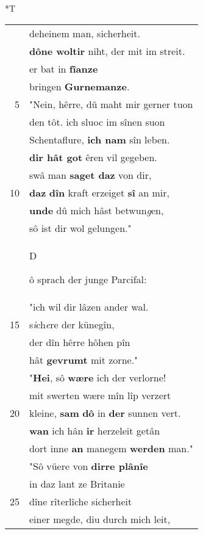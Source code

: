 \documentclass[8pt,a4paper,notitlepage]{article}
\begin{document}
\begin{table}[ht]
\begin{minipage}[t]{0.5\linewidth}
\end{minipage}
\hspace{0.5cm}
\begin{minipage}[t]{0.5\linewidth}
\small
\begin{center}*T
\end{center}
\begin{tabular}{rl}
 & deheinem man, sicherheit.\\ 
 & \textbf{dône woltir} niht, der mit im streit.\\ 
 & er bat in \textbf{fîanze}\\ 
 & bringen \textbf{Gurnemanze}.\\ 
5 & "Nein, hêrre, dû maht mir gerner tuon\\ 
 & den tôt. ich sluoc im sînen suon\\ 
 & Schentaflure, \textbf{ich nam} sîn leben.\\ 
 & \textbf{dir hât got} êren vil gegeben.\\ 
 & swâ man \textbf{saget daz} von dir,\\ 
10 & \textbf{daz} \textbf{dîn} kraft erzeiget \textbf{sî} an mir,\\ 
 & \textbf{unde} dû mich hâst betwun\textit{g}en,\\ 
 & sô ist dir wol gelungen."\\ 
 & \begin{large}D\end{large}ô sprach der junge Parcifal:\\ 
 & "ich wil dir lâzen ander wal.\\ 
15 & s\textit{i}ch\textit{e}re der künegîn,\\ 
 & der dîn hêrre hôhen pîn\\ 
 & hât \textbf{gevrumt} mit zorne."\\ 
 & "\textbf{Hei}, sô \textbf{wære} ich der verlorne!\\ 
 & mit swerten wære mîn lîp verzert\\ 
20 & kleine, \textbf{sam} \textbf{dô} in \textbf{der} sunnen vert.\\ 
 & \textbf{wan} ich hân \textbf{ir} herzeleit getân\\ 
 & dort inne \textbf{an} manegem \textbf{werden} man."\\ 
 & "Sô vüere von \textbf{dirre plânîe}\\ 
 & in daz lant ze Britanie\\ 
25 & dîne rîterlîche sicherheit\\ 
 & einer megde, diu durch mich leit,\\ 

\end{tabular}
\end{minipage}
\end{table}
\end{document}
